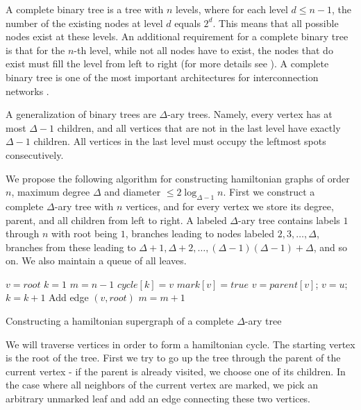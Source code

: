 \documentclass[10pt,a4paper]{article}
\newcommand{\rz}{\vspace{0.1cm}}
\begin{document}
A complete binary tree is a tree with $n$ levels, where for each
level $d \leqslant n - 1$, the number of the existing nodes at level
$d$ equals $2^d$. This means that all possible nodes exist at these
levels. An additional requirement for a complete binary tree is that
for the $n$-th level, while not all nodes have to exist, the nodes
that do exist must fill the level from left to right (for more
details see \cite{cormen01}). A complete binary tree is one of the
most important architectures for interconnection networks
\cite{leighton92}. \rz

A generalization of binary trees are $\Delta$-ary trees. Namely,
every vertex has at most $\Delta - 1$ children, and all vertices
that are not in the last level have exactly $\Delta - 1$ children.
All vertices in the last level must occupy the leftmost spots
consecutively. \rz

We propose the following algorithm for constructing hamiltonian
graphs of order $n$, maximum degree $\Delta$ and diameter $\leq 2
\log_{\Delta - 1} n$. First we construct a complete $\Delta$-ary
tree with $n$ vertices, and for every vertex we store its degree,
parent, and all children from left to right. A labeled $\Delta$-ary
tree contains labels $1$ through $n$ with root being $1$, branches
leading to nodes labeled $2, 3, \ldots, \Delta$, branches from these
leading to $\Delta + 1, \Delta + 2, \ldots, (\Delta - 1)(\Delta - 1)
+ \Delta$, and so on. We also maintain a queue of all leaves. \rz

\begin{algorithm}
    \small

    $v = root$\;
    $k = 1$\;
    $m = n - 1$\;
     {
        $cycle [k] = v$\;
        $mark [v] = true$\;
         {
            $v = parent [v]$;
        }
         {
            $v = u$;
        }
        $k = k + 1$\;
    }
    Add edge $(v, root)$\;
    $m = m + 1$\;
    \caption{Constructing a hamiltonian supergraph of a complete $\Delta$-ary tree}
\end{algorithm}


We will traverse vertices in order to form a hamiltonian cycle. The
starting vertex is the root of the tree. First we try to go up the
tree through the parent of the current vertex - if the parent is
already visited, we choose one of its children. In the case where
all neighbors of the current vertex are marked, we pick an arbitrary
unmarked leaf and add an edge connecting these two vertices.
\end{document}
